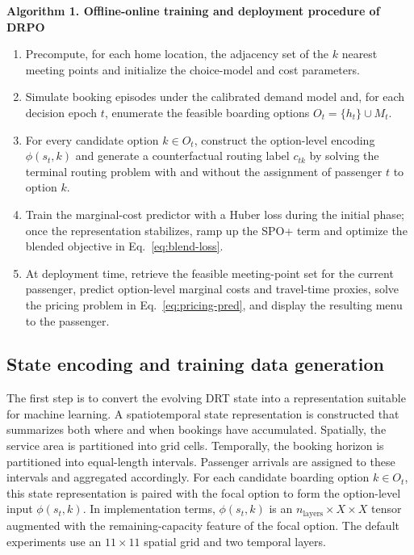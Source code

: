 \documentclass[preprint,12pt,authoryear]{elsarticle}
\begin{document}
\noindent\textbf{Algorithm 1. Offline-online training and deployment procedure of DRPO}
\begin{enumerate}
\item Precompute, for each home location, the adjacency set of the $k$ nearest meeting points and initialize the choice-model and cost parameters.
\item Simulate booking episodes under the calibrated demand model and, for each decision epoch $t$, enumerate the feasible boarding options $O_t = \{h_t\}\cup M_t$.
\item For every candidate option $k\in O_t$, construct the option-level encoding $\phi(s_t,k)$ and generate a counterfactual routing label $c_{tk}$ by solving the terminal routing problem with and without the assignment of passenger $t$ to option $k$.
\item Train the marginal-cost predictor with a Huber loss during the initial phase; once the representation stabilizes, ramp up the SPO+ term and optimize the blended objective in Eq.~\eqref{eq:blend-loss}.
\item At deployment time, retrieve the feasible meeting-point set for the current passenger, predict option-level marginal costs and travel-time proxies, solve the pricing problem in Eq.~\eqref{eq:pricing-pred}, and display the resulting menu to the passenger.
\end{enumerate}

\subsection{State encoding and training data generation}

The first step is to convert the evolving DRT state into a representation suitable for machine learning. A spatiotemporal state representation is constructed that summarizes both where and when bookings have accumulated. Spatially, the service area is partitioned into grid cells. Temporally, the booking horizon is partitioned into equal-length intervals. Passenger arrivals are assigned to these intervals and aggregated accordingly. For each candidate boarding option $k\in O_t$, this state representation is paired with the focal option to form the option-level input $\phi(s_t,k)$. In implementation terms, $\phi(s_t,k)$ is an $n_{\text{layers}}\times X\times X$ tensor augmented with the remaining-capacity feature of the focal option. The default experiments use an $11\times 11$ spatial grid and two temporal layers.
\end{document}
